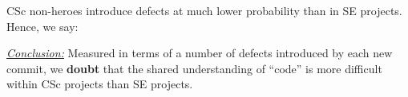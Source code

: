 \documentclass[conference,10pt]{IEEEtran}
\newenvironment{RQ}{\vspace{1mm}\begin{tcolorbox}[enhanced,width=3.4in,size=fbox,colback=red!5!white,drop shadow southeast,sharp corners]}{\end{tcolorbox}}
\begin{document}
CSc non-heroes introduce defects at much lower probability than in SE projects. Hence, we say:

\begin{RQ}
\textit{\underline{Conclusion:}} Measured in terms
of a number of defects introduced by each new commit, we \textbf{doubt} that the shared understanding of ``code'' is more difficult within  CSc projects than SE projects.
\end{RQ}




\end{document}
